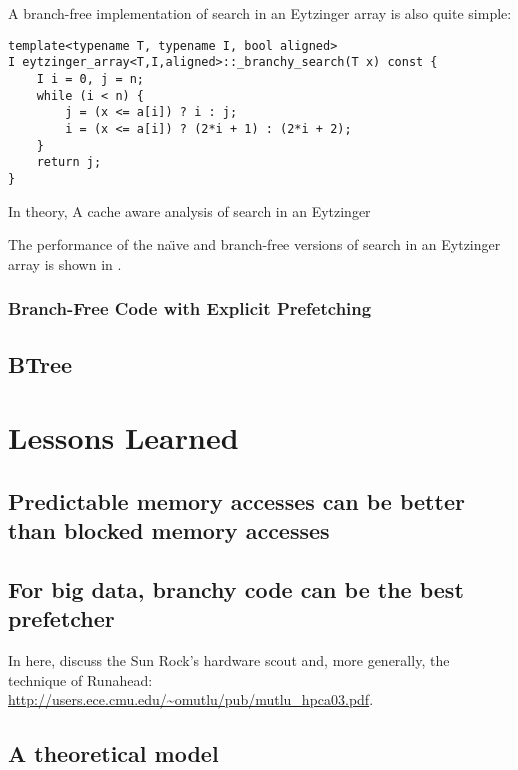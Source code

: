 \documentclass{patmorin}
\begin{document}
A branch-free implementation of search in an Eytzinger array is also
quite simple:

\begin{listing}
\begin{verbatim}
template<typename T, typename I, bool aligned>
I eytzinger_array<T,I,aligned>::_branchy_search(T x) const {
    I i = 0, j = n;
    while (i < n) {
        j = (x <= a[i]) ? i : j;
        i = (x <= a[i]) ? (2*i + 1) : (2*i + 2);
    }
    return j;
}
\end{verbatim}
\end{listing}

In theory, 
A cache aware analysis of search in an Eytzinger

The performance of the na\"{\i}ve and branch-free versions of search in an Eytzinger array is shown in .


\subsubsection{Branch-Free Code with Explicit Prefetching}

\subsection{BTree}


\section{Lessons Learned}

\subsection{Predictable memory accesses can be better than blocked
            memory accesses}

\subsection{For big data, branchy code can be the best prefetcher}

In here, discuss the Sun Rock's hardware scout and, more generally, the technique of Runahead: \url{http://users.ece.cmu.edu/~omutlu/pub/mutlu_hpca03.pdf}.

\subsection{A theoretical model}
\end{document}
